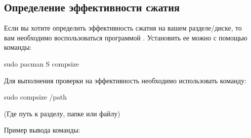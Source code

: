 \documentclass[letterpaper,10pt,russian,openany]{sphinxmanual}
\begin{document}
\ignorespaces 

\subsection{Определение эффективности сжатия}
\label{\detokenize{source/file-systems:efficiency-test}}\label{\detokenize{source/file-systems:index-3}}\label{\detokenize{source/file-systems:id6}}
\sphinxAtStartPar
Если вы хотите определить эффективность сжатия на вашем разделе/диске, то вам необходимо воспользоваться программой .
Установить ее можно с помощью команды:

\begin{sphinxVerbatim}[commandchars=\\\{\}]
sudo pacman \PYGZhy{}S compsize
\end{sphinxVerbatim}

\sphinxAtStartPar
Для выполнения проверки на эффективность необходимо использовать команду:

\begin{sphinxVerbatim}[commandchars=\\\{\}]
sudo compsize /path
\end{sphinxVerbatim}

\sphinxAtStartPar
(Где  \sphinxhyphen{} путь к разделу, папке или файлу)

\sphinxAtStartPar
Пример вывода команды:

\noindent{}
\end{document}
